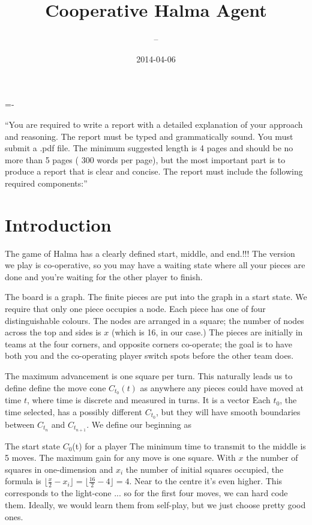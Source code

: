 \documentclass[twocolumn]{article}
\author{\name~--~\id}
\title{Cooperative Halma Agent}
\date{2014-04-06}
\begin{document}
\abovedisplayskip=-\baselineskip

\maketitle


``You are required to write a report with a detailed explanation of your approach and reasoning. The report must be typed and grammatically sound. You must submit a .pdf file. The minimum suggested length is 4 pages and should be no more than 5 pages ( 300 words per
page), but the most important part is to produce a report that is clear and concise. The report must include the following required components:''

\section{Introduction}

The game of Halma has a clearly defined start, middle, and end.!!!\cite{} The version we play is co-operative, so you may have a waiting state where all your pieces are done and you're waiting for the other player to finish.

The board is a graph. The finite pieces are put into the graph in a start state. We require that only one piece occupies a node. Each piece has one of four distinguishable colours. The nodes are arranged in a square; the number of nodes across the top and sides is $x$ (which is 16, in our case.) The pieces are initially in teams at the four corners, and opposite corners co-operate; the goal is to have both you and the co-operating player switch spots before the other team does.

The maximum advancement is one square per turn.
This naturally leads us to define define the move cone $C_{t_{0}}(t)$ as anywhere any pieces could have moved at time $t$, where time is discrete and measured in turns. It is a vector  Each $t_{0}$, the time selected, has a possibly different $C_{t_{0}}$, but they will have smooth boundaries between $C_{t_{n}}$ and $C_{t_{n+1}}$. We define our beginning as 

The start state $C_{0}$(t) for a player 
The minimum time to transmit to the middle is 5 moves. The maximum gain for any move is one square. With $x$ the number of squares in one-dimension and $x_{i}$ the number of initial squares occupied, the formula is $\lfloor\frac{x}{2} - x_{i}\rfloor = \lfloor\frac{16}{2} - 4\rfloor = 4$. Near to the centre it's even higher. This corresponds to the light-cone ... so for the first four moves, we can hard code them. Ideally, we would learn them from self-play, but we just choose pretty good ones.
\end{document}

